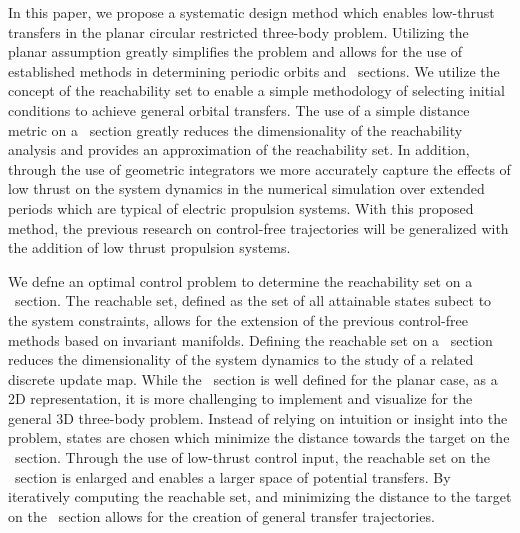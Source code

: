 \documentclass[smallcondensed]{svjour3}
\begin{document}



In this paper, we propose a systematic design method which enables low-thrust transfers in the planar circular restricted three-body problem.
Utilizing the planar assumption greatly simplifies the problem and allows for the use of established methods in determining periodic orbits and \Poincare~sections.
We utilize the concept of the reachability set to enable a simple methodology of selecting initial conditions to achieve general orbital transfers. 
The use of a simple distance metric on a \Poincare~section greatly reduces the dimensionality of the reachability analysis and provides an approximation of the reachability set.
In addition, through the use of geometric integrators we more accurately capture the effects of low thrust on the system dynamics in the numerical simulation over extended periods which are typical of electric propulsion systems. 
With this proposed method, the previous research on control-free trajectories will be generalized with the addition of low thrust propulsion systems.

We defne an optimal control problem to determine the reachability set on a \Poincare~section.
The reachable set, defined as the set of all attainable states subect to the system constraints, allows for the extension of the previous control-free methods based on invariant manifolds.
Defining the reachable set on a \Poincare~section reduces the dimensionality of the system dynamics to the study of a related discrete update map.
While the \Poincare~section is well defined for the planar case, as a 2D representation, it is more challenging to implement and visualize for the general 3D three-body problem.
Instead of relying on intuition or insight into the problem, states are chosen which minimize the distance towards the target on the \Poincare~section.
Through the use of low-thrust control input, the reachable set on the \Poincare~section is enlarged and enables a larger space of potential transfers.
By iteratively computing the reachable set, and minimizing the distance to the target on the \Poincare~section allows for the creation of general transfer trajectories.
\end{document}
